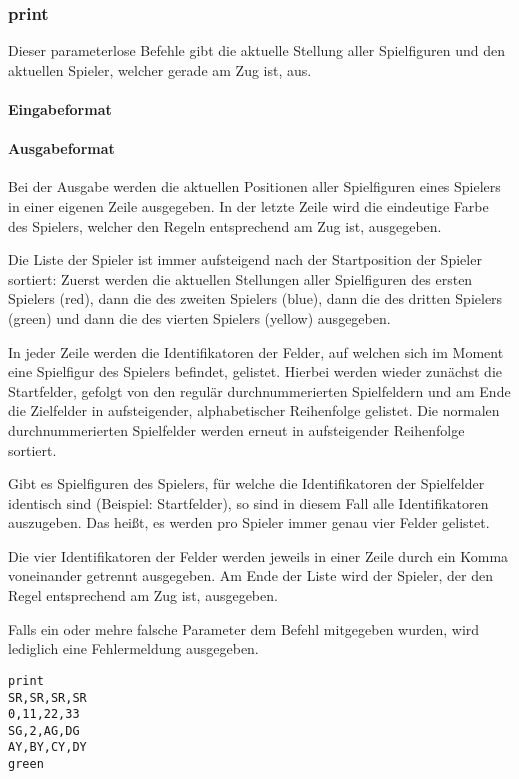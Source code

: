 \subsubsection*{print}
Dieser parameterlose Befehle gibt die aktuelle Stellung aller Spielfiguren und den aktuellen Spieler, welcher gerade am Zug ist, aus.
\paragraph{Eingabeformat}
\paragraph{Ausgabeformat}
Bei der Ausgabe werden die aktuellen Positionen aller Spielfiguren eines Spielers in einer eigenen Zeile ausgegeben. In der letzte Zeile wird die eindeutige Farbe des Spielers, welcher den Regeln entsprechend am Zug ist, ausgegeben. 

Die Liste der Spieler ist immer aufsteigend nach der Startposition der Spieler sortiert: Zuerst werden die aktuellen Stellungen aller Spielfiguren des ersten Spielers (red), dann die des zweiten Spielers (blue), dann die des dritten Spielers (green) und dann die des vierten Spielers (yellow) ausgegeben. 

In jeder Zeile werden die Identifikatoren der Felder, auf welchen sich im Moment eine Spielfigur des Spielers befindet, gelistet. Hierbei werden wieder zunächst die Startfelder, gefolgt von den regulär durchnummerierten Spielfeldern und am Ende die Zielfelder in aufsteigender, alphabetischer Reihenfolge gelistet. Die normalen durchnummerierten Spielfelder werden erneut in aufsteigender Reihenfolge sortiert.

Gibt es Spielfiguren des Spielers, für welche die Identifikatoren der Spielfelder identisch sind (Beispiel: Startfelder), so sind in diesem Fall alle Identifikatoren auszugeben. Das heißt, es werden pro Spieler immer genau vier Felder gelistet. 

Die vier Identifikatoren der Felder werden jeweils in einer Zeile durch ein Komma voneinander getrennt ausgegeben. Am Ende der Liste wird der Spieler, der den Regel entsprechend am Zug ist, ausgegeben. 

Falls ein oder mehre falsche Parameter dem Befehl mitgegeben wurden, wird lediglich eine Fehlermeldung ausgegeben.
\begin{tcolorbox}[title=Beispiel]
\begin{verbatim}
print
SR,SR,SR,SR
0,11,22,33
SG,2,AG,DG
AY,BY,CY,DY
green
\end{verbatim}
\end{tcolorbox}

